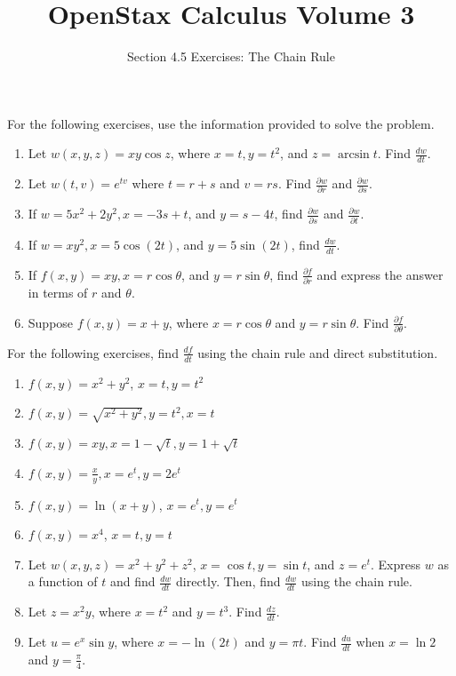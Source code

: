 \documentclass{exercises}
\title{OpenStax Calculus Volume 3}
\subtitle{Section 4.5 Exercises: The Chain Rule}
\author{}
\date{}
\begin{document}
\maketitle


For the following exercises, use the information provided to solve the problem.

\begin{enumerate}[start=1]
\item Let $w(x,y,z)=xy\cos z$, where $x=t,y=t^{2}$, and $z=\arcsin t$. Find $\frac{dw}{dt}$.
\item Let $w(t,v)=e^{tv}$ where $t=r+s$ and $v=rs$. Find $\frac{\partial w}{\partial r}$ and $\frac{\partial w}{\partial s}$.
\item If $w=5x^{2}+2y^{2},x=-3s+t$, and $y=s-4t$, find $\frac{\partial w}{\partial s}$ and $\frac{\partial w}{\partial t}$.
\item If $w=xy^{2},x=5\cos(2t)$, and $y=5\sin(2t)$, find $\frac{dw}{dt}$.
\item If $f(x,y)=xy,x=r\cos \theta$, and $y=r\sin \theta$, find $\frac{\partial f}{\partial r}$ and express the answer in terms of $r$ and $\theta$.
\item Suppose $f(x,y)=x+y$, where $x=r\cos \theta$ and $y=r\sin \theta$. Find $\frac{\partial f}{\partial \theta}$.
\end{enumerate}

For the following exercises, find $\frac{df}{dt}$ using the chain rule and direct substitution.

\begin{enumerate}[resume]
\item $f(x,y)=x^{2}+y^{2}$, $x=t,y=t^{2}$
\item $f(x,y)=\sqrt{x^{2}+y^{2}},y=t^{2},x=t$
\item $f(x,y)=xy,x=1-\sqrt{t},y=1+\sqrt{t}$
\item $f(x,y)=\frac{x}{y},x=e^{t},y=2e^{t}$
\item $f(x,y)=\ln(x+y)$, $x=e^{t},y=e^{t}$
\item $f(x,y)=x^{4}$, $x=t,y=t$
\item Let $w(x,y,z)=x^{2}+y^{2}+z^{2}$, $x=\cos t,y=\sin t$, and $z=e^{t}$. Express $w$ as a function of $t$ and find $\frac{dw}{dt}$ directly. Then, find $\frac{dw}{dt}$ using the chain rule.
\item Let $z=x^{2}y$, where $x=t^{2}$ and $y=t^{3}$. Find $\frac{dz}{dt}$.
\item Let $u=e^{x}\sin y$, where $x=-\ln(2t)$ and $y=\pi t$. Find $\frac{du}{dt}$ when $x=\ln 2$ and $y=\frac{\pi}{4}$.
\end{enumerate}
\end{document}
